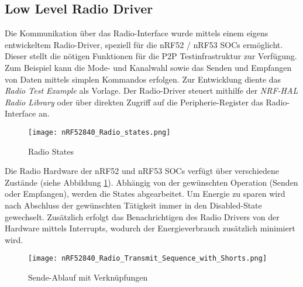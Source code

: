 \subsection{Low Level Radio Driver}\label{sec:LowLevelRadioDriver}

Die Kommunikation über das Radio-Interface wurde mittels einem eigens entwickeltem Radio-Driver, speziell für die nRF52 / nRF53 SOCs ermöglicht. Dieser stellt die nötigen Funktionen für die P2P Testinfrastruktur zur Verfügung. Zum Beispiel kann die Mode- und Kanalwahl sowie das Senden und Empfangen von Daten mittels simplen Kommandos erfolgen. Zur Entwicklung diente das \textit{Radio Test Example} \cite{nrf_connect_sdk_radio_test_example_2020} als Vorlage. Der Radio-Driver steuert mithilfe der \textit{NRF-HAL Radio Library} oder über direkten Zugriff auf die Peripherie-Register das Radio-Interface an.

\begin{figure} [H]
	\centering
	\texttt{[image: nRF52840\_Radio\_states.png]}
	\caption{Radio States \cite{nordic_semi_nrf_infocenter_radio_states_2020}}
	\label{fig:RadioStatesP2P}
\end{figure}

Die Radio Hardware der nRF52 und nRF53 SOCs verfügt über verschiedene Zustände (siehe Abbildung \ref{fig:RadioStatesP2P}). Abhängig von der gewünschten Operation (Senden oder Empfangen), werden die States abgearbeitet. Um Energie zu sparen wird nach Abschluss der gewünschten Tätigkeit immer in den Disabled-State gewechselt. Zusätzlich erfolgt das Benachrichtigen des Radio Drivers von der Hardware mittels Interrupts, wodurch der Energieverbrauch zusätzlich minimiert wird.

\begin{figure} [H]
	\centering
	\texttt{[image: nRF52840\_Radio\_Transmit\_Sequence\_with\_Shorts.png]}
	\caption{Sende-Ablauf mit Verknüpfungen \cite{nordic_semi_nrf_infocenter_radio_transmit_sequence_2020}}
	\label{fig:RadioTransmitSequP2P}
\end{figure}

